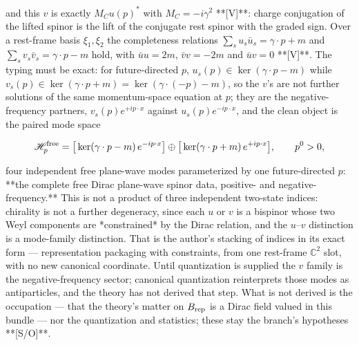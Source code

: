 and this $v$ is exactly $M_C u(p)^*$ with $M_C = -i\gamma^2$ **[V]**: charge conjugation of the lifted spinor is the lift of the conjugate rest spinor with the graded sign. Over a rest-frame basis $\xi_1,\xi_2$ the completeness relations $\sum_su_s\bar u_s = \gamma\cdot p+m$ and $\sum_sv_s\bar v_s = \gamma\cdot p-m$ hold, with $\bar uu = 2m$, $\bar vv = -2m$ and $\bar uv = 0$ **[V]**. The typing must be exact: for future-directed $p$, $u_s(p)\in\ker(\gamma\cdot p-m)$ while $v_s(p)\in\ker(\gamma\cdot p+m) = \ker(\gamma\cdot(-p)-m)$, so the $v$'s are not further solutions of the same momentum-space equation at $p$; they are the negative-frequency partners, $v_s(p)e^{+ip\cdot x}$ against $u_s(p)e^{-ip\cdot x}$, and the clean object is the paired mode space

$$\mathscr H^{\rm free}_p = \big[\ker(\gamma\cdot p-m)\,e^{-ip\cdot x}\big]\oplus\big[\ker(\gamma\cdot p+m)\,e^{+ip\cdot x}\big],\qquad p^0>0,$$

four independent free plane-wave modes parameterized by one future-directed $p$: **the complete free Dirac plane-wave spinor data, positive- and negative-frequency.** This is not a product of three independent two-state indices: chirality is not a further degeneracy, since each $u$ or $v$ is a bispinor whose two Weyl components are *constrained* by the Dirac relation, and the $u$–$v$ distinction is a mode-family distinction. That is the author's stacking of indices in its exact form — representation packaging with constraints, from one rest-frame $\mathbb C^2$ slot, with no new canonical coordinate. Until quantization is supplied the $v$ family is the negative-frequency sector; canonical quantization reinterprets those modes as antiparticles, and the theory has not derived that step. What is not derived is the occupation — that the theory's matter on $B_{\rm rep}$ is a Dirac field valued in this bundle — nor the quantization and statistics; these stay the branch's hypotheses **[S/O]**.

